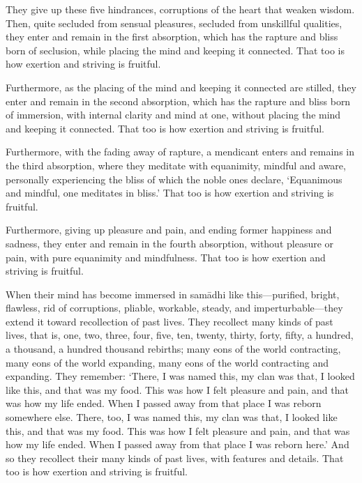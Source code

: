 \documentclass[12pt,openany]{book}%
\begin{document}
They give up these five hindrances, corruptions of the heart that weaken wisdom. Then, quite secluded from sensual pleasures, secluded from unskillful qualities, they enter and remain in the first absorption, which has the rapture and bliss born of seclusion, while placing the mind and keeping it connected. That too is how exertion and striving is fruitful. 

Furthermore, as the placing of the mind and keeping it connected are stilled, they enter and remain in the second absorption, which has the rapture and bliss born of immersion, with internal clarity and mind at one, without placing the mind and keeping it connected. That too is how exertion and striving is fruitful. 

Furthermore, with the fading away of rapture, a mendicant enters and remains in the third absorption, where they meditate with equanimity, mindful and aware, personally experiencing the bliss of which the noble ones declare, ‘Equanimous and mindful, one meditates in bliss.’ That too is how exertion and striving is fruitful. 

Furthermore, giving up pleasure and pain, and ending former happiness and sadness, they enter and remain in the fourth absorption, without pleasure or pain, with pure equanimity and mindfulness. That too is how exertion and striving is fruitful. 

When their mind has become immersed in \textsanskrit{samādhi} like this—purified, bright, flawless, rid of corruptions, pliable, workable, steady, and imperturbable—they extend it toward recollection of past lives. They recollect many kinds of past lives, that is, one, two, three, four, five, ten, twenty, thirty, forty, fifty, a hundred, a thousand, a hundred thousand rebirths; many eons of the world contracting, many eons of the world expanding, many eons of the world contracting and expanding. They remember: ‘There, I was named this, my clan was that, I looked like this, and that was my food. This was how I felt pleasure and pain, and that was how my life ended. When I passed away from that place I was reborn somewhere else. There, too, I was named this, my clan was that, I looked like this, and that was my food. This was how I felt pleasure and pain, and that was how my life ended. When I passed away from that place I was reborn here.’ And so they recollect their many kinds of past lives, with features and details. That too is how exertion and striving is fruitful. 
\end{document}

